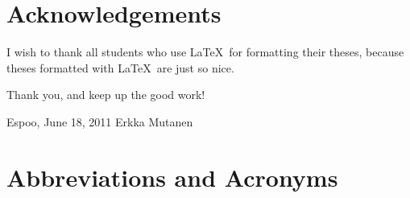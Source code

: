 \documentclass[12pt,a4paper,oneside,pdftex]{report}
\newcommand{\DATE}{June 18, 2011}
\newcommand{\AUTHOR}{Erkka Mutanen}
\begin{document}


\chapter*{Acknowledgements}

I wish to thank all students who use \LaTeX\ for formatting their theses,
because theses formatted with \LaTeX\ are just so nice.

Thank you, and keep up the good work!
\vskip 10mm

\noindent Espoo, \DATE
\vskip 5mm
\noindent\AUTHOR

\cleardoublepage
\tableofcontents

\cleardoublepage
% 

\chapter*{Abbreviations and Acronyms}

\end{document}

